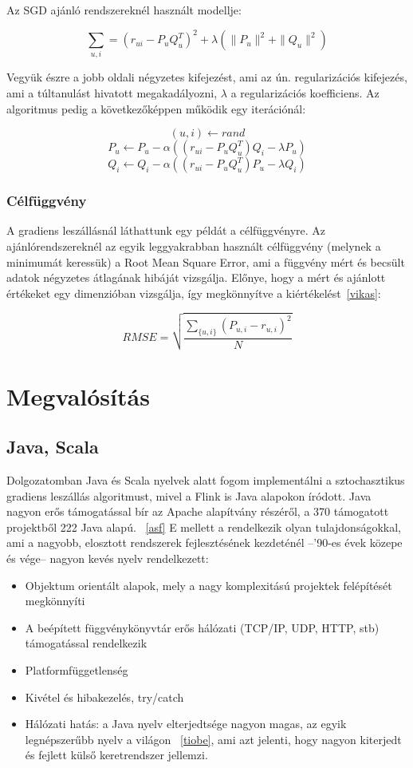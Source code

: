 \documentclass[a4paper,12pt]{article}
\begin{document}
Az SGD ajánló rendszereknél használt modellje:

\[\sum\limits_{u,i} = (r_{ui}-P_{u}Q_{u}^T)^2 + \lambda (\parallel P_{u}\parallel^2 +\parallel Q_{u}\parallel^2)\]

Vegyük észre a jobb oldali négyzetes kifejezést, ami az ún. regularizációs kifejezés, ami a túltanulást hivatott megakadályozni, $\lambda$ a regularizációs koefficiens. Az algoritmus pedig a következőképpen működik egy iterációnál: 

\[(u, i) \leftarrow rand \]
\[P_{u} \leftarrow P_{u} - \alpha((r_{ui}-P_{u}Q_{u}^T)Q_{i} - \lambda P_{u})\]
\[Q_{i} \leftarrow Q_{i} - \alpha((r_{ui}-P_{u}Q_{u}^T)P_{u} - \lambda Q_{i})\]

\subsubsection{Célfüggvény}
A gradiens leszállásnál láthattunk egy példát a célfüggvényre. Az ajánlórendszereknél az egyik leggyakrabban használt célfüggvény (melynek a minimumát keressük) a Root Mean Square Error, ami a függvény mért és becsült adatok négyzetes átlagának hibáját vizsgálja. Előnye, hogy a mért és ajánlott értékeket egy dimenzióban vizsgálja, így megkönnyítve a kiértékelést~\ref{vikas}:  

\[RMSE =   \sqrt{\frac{ \sum_{\{u,i\}} (P_{u,i} - r_{u,i})^2}{N}}\] 

\section{Megvalósítás}

\subsection{Java, Scala}
Dolgozatomban Java és Scala nyelvek alatt fogom implementálni a sztochasztikus gradiens leszállás algoritmust, mivel a Flink is Java alapokon íródott. Java nagyon erős támogatással bír az Apache alapítvány részéről, a 370 támogatott projektből 222 Java alapú. ~\ref{asf} E mellett a rendelkezik olyan tulajdonságokkal, ami a nagyobb, elosztott rendszerek fejlesztésének kezdeténél --'90-es évek közepe és vége-- nagyon kevés nyelv rendelkezett:
\begin{itemize}
\item Objektum orientált alapok, mely a nagy komplexitású projektek felépítését megkönnyíti
\item A beépített függvénykönyvtár erős hálózati (TCP/IP, UDP, HTTP, stb) támogatással rendelkezik
\item Platformfüggetlenség
\item Kivétel és hibakezelés, try/catch
\item Hálózati hatás: a Java nyelv elterjedtsége nagyon magas, az egyik legnépszerűbb nyelv a világon ~\ref{tiobe}, ami azt jelenti, hogy nagyon kiterjedt és fejlett külső keretrendszer jellemzi.
\end{itemize}
\end{document}
